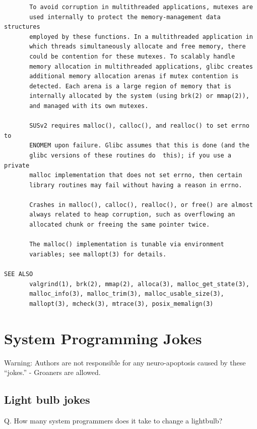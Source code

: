 {\begin{center}
\begin{verbatim}
       To avoid corruption in multithreaded applications, mutexes are
       used internally to protect the memory-management data structures
       employed by these functions. In a multithreaded application in
       which threads simultaneously allocate and free memory, there
       could be contention for these mutexes. To scalably handle
       memory allocation in multithreaded applications, glibc creates
       additional memory allocation arenas if mutex contention is
       detected. Each arena is a large region of memory that is
       internally allocated by the system (using brk(2) or mmap(2)),
       and managed with its own mutexes. 

       SUSv2 requires malloc(), calloc(), and realloc() to set errno to
       ENOMEM upon failure. Glibc assumes that this is done (and the
       glibc versions of these routines do  this); if you use a private
       malloc implementation that does not set errno, then certain
       library routines may fail without having a reason in errno.

       Crashes in malloc(), calloc(), realloc(), or free() are almost
       always related to heap corruption, such as overflowing an
       allocated chunk or freeing the same pointer twice. 

       The malloc() implementation is tunable via environment
       variables; see mallopt(3) for details. 

SEE ALSO
       valgrind(1), brk(2), mmap(2), alloca(3), malloc_get_state(3),
       malloc_info(3), malloc_trim(3), malloc_usable_size(3),
       mallopt(3), mcheck(3), mtrace(3), posix_memalign(3)
\end{verbatim}
\end{center}
}

\section{System Programming Jokes}


Warning: Authors are not responsible for any neuro-apoptosis caused by these ``jokes.'' - Groaners are allowed.

\subsection{Light bulb jokes}

Q. How many system programmers does it take to change a lightbulb?

